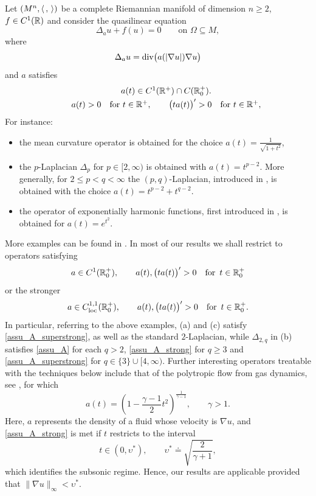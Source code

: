 \documentclass[10 pt,a4paper]{article}
\theoremstyle{definition}
\begin{document}
Let $(M^n,\langle \, , \, \rangle)$ be a complete Riemannian manifold of dimension $n \ge 2$, $f \in C^1(\mathbb R)$ and consider the quasilinear equation 
\begin{equation}\label{equazu}
	\Delta_a u + f(u)=0 \qquad \text{on } \Omega \subseteq M,
\end{equation}
where
\begin{equation}\label{def_T}
	\Delta_a u = \mathrm{div}\big(a(|\nabla u|)\nabla u\big) 
\end{equation}
and $a$ satisfies
\begin{equation}\label{assu_A}
	\begin{array}{rcl}
		 & \quad a(t) \in C^1(\mathbb R^+) \cap C(\mathbb R^+_0). \\[0.1cm]
		& \quad a(t)>0 \ \  \text{ for } t \in \mathbb R^+, \qquad \big(ta(t) \big)' >0 \ \ \text{ for } t \in \mathbb R^+,
	\end{array}
\end{equation}
For instance: 
\begin{itemize}
	\item[(a)] the mean curvature operator is obtained for the choice $a(t) = \frac{1}{\sqrt{1+t^2}}$, 
	\item[(b)] the $p$-Laplacian $\Delta_p$ for $p \in [2,\infty)$ is obtained with $a(t) = t^{p-2}$. More generally, for $2 \le p < q < \infty$ the $(p,q)$-Laplacian, introduced in  \cite{zhikov,marcellini}, is obtained with the choice $a(t) = t^{p-2} + t^{q-2}$. 
	\item[(c)] the operator of exponentially harmonic functions, first introduced in \cite{duc_eels, eels_lemaire}, is obtained for $a(t)= e^{t^2}$.
\end{itemize}

More examples can be found in \cite{serrin2}. In most of our results we shall restrict to operators satisfying
\begin{equation}\label{assu_A_strong}
a \in C^1(\mathbb R^+_0), \qquad a(t), \big( ta(t)\big)' > 0 \quad \text{for } \, t \in \mathbb R^+_0
\end{equation}
%
or the stronger
\begin{equation}\label{assu_A_superstrong}
	a\in C^{1,1}_{\mathrm{loc}}(\mathbb R_0^+), \qquad a(t), \big( ta(t)\big)' > 0 \quad \text{for } \, t \in \mathbb R^+_0.
\end{equation}
In particular, referring to the above examples, (a) and (c) satisfy \eqref{assu_A_superstrong}, as well as the standard $2$-Laplacian, while $\Delta_{2,q}$ in (b) satisfies \eqref{assu_A} for each $q>2$, \eqref{assu_A_strong} for $q \ge 3$ and \eqref{assu_A_superstrong} for $q \in \{3\} \cup [4,\infty)$. Further interesting operators treatable with the techniques below include that of the polytropic flow from gas dynamics, see \cite{sibner_sibner}, for which   
\[
a(t) = \left( 1 - \frac{\gamma-1}{2}t^2 \right)^\frac{1}{\gamma-1}, \qquad \gamma >1.
\]
Here, $a$ represents the density of a fluid whose velocity is $\nabla u$, and \eqref{assu_A_strong} is met if $t$ restricts to the interval 
\[
t \in (0, \upsilon^*), \qquad \upsilon^* \doteq \sqrt{ \frac{2}{\gamma+1}},
\]
which identifies the subsonic regime. Hence, our results are applicable provided that $\|\nabla u\|_\infty < \upsilon^*$.
\end{document}
